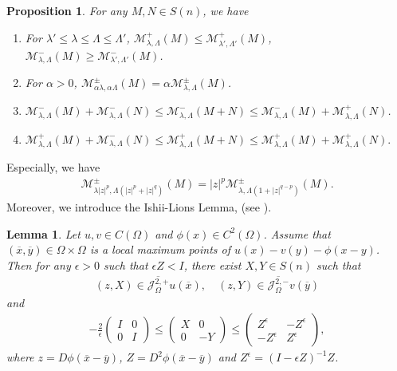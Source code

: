\documentclass[reqno]{amsart}
\theoremstyle{plain}
\newtheorem{lem}{Lemma}[section]
\newtheorem{prop}{Proposition}[section]
\theoremstyle{definition}
\theoremstyle{remark}
\numberwithin{equation}{section}
\begin{document}
\begin{prop} 
For any $M,N \in S(n)$, we have
    \begin{enumerate}
        \item For $\lambda' \leq \lambda \leq \Lambda \leq \Lambda'$, $\mathcal{M}_{\lambda,\Lambda}^{+}(M) \leq \mathcal{M}_{\lambda',\Lambda'}^{+}(M)$, $\mathcal{M}_{\lambda,\Lambda}^{-}(M) \geq \mathcal{M}_{\lambda',\Lambda'}^{-}(M)$.\\
        \item For $\alpha >0$, $\mathcal{M}_{\alpha\lambda,\alpha\Lambda}^{\pm}(M) = \alpha\mathcal{M}_{\lambda,\Lambda}^{\pm}(M)$. \\
        \item $ \mathcal{M}_{\lambda,\Lambda}^{-}(M) +\mathcal{M}_{\lambda,\Lambda}^{-}(N)\leq \mathcal{M}_{\lambda,\Lambda}^{-}(M+N) \leq \mathcal{M}_{\lambda,\Lambda}^{-}(M) +\mathcal{M}_{\lambda,\Lambda}^{+}(N)$. \\
        \item $ \mathcal{M}_{\lambda,\Lambda}^{+}(M) +\mathcal{M}_{\lambda,\Lambda}^{-}(N)\leq \mathcal{M}_{\lambda,\Lambda}^{+}(M+N) \leq \mathcal{M}_{\lambda,\Lambda}^{+}(M) +\mathcal{M}_{\lambda,\Lambda}^{+}(N).$ 
    \end{enumerate}
\end{prop}
Especially, we have
\begin{align*}
    \mathcal{M}^\pm_{\lambda|z|^p,\Lambda(|z|^p + |z|^q)}(M) = |z|^p\mathcal{M}^\pm_{\lambda,\Lambda(1 + |z|^{q-p})}(M).
\end{align*}
Moreover, we introduce the Ishii-Lions Lemma, (see \cite{Ishii92,Silvestre13}). 
\begin{lem} \label{IL1}
    Let $u,v \in C(\Omega)$ and $\phi(x) \in C^2(\Omega)$.
    Assume that $(\overline{x},\overline{y}) \in \Omega\times\Omega$ is a local maximum points of $u(x)-v(y) -\phi(x-y)$.
    Then for any $\epsilon>0$ such that $\epsilon Z<I$, there exist $X,Y \in S(n)$ such that
    \begin{align*}
        (z,X) \in \overline{\mathcal{J}^{2,+}_\Omega} u(\overline{x}), \quad (z,Y) \in \overline{\mathcal{J}^{2,-}_\Omega} v(\overline{y})
    \end{align*}
    and
    \begin{align*}
        -\frac{2}{\epsilon} \begin{pmatrix}
             I & 0 \\
             0 & I
         \end{pmatrix}
         \leq 
        \begin{pmatrix}
             X & 0 \\
             0 &-Y
         \end{pmatrix}
         \leq 
         \begin{pmatrix}
             Z^\epsilon & -Z^\epsilon \\
             -Z^\epsilon & Z^\epsilon
         \end{pmatrix},
    \end{align*}
    where $z = D\phi(\overline{x}-\overline{y})$, $Z = D^2\phi(\overline{x}-\overline{y})$ and $Z^\epsilon = (I-\epsilon Z)^{-1}Z$.
\end{lem}
\end{document}
